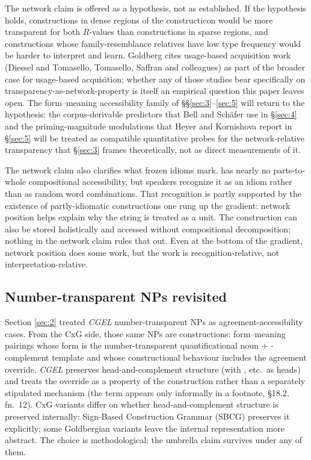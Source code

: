 The network claim is offered as a hypothesis, not as established. If the hypothesis holds, constructions in dense regions of the constructicon would be more transparent for both $R$-values than constructions in sparse regions, and constructions whose family-resemblance relatives have low type frequency would be harder to interpret and learn. Goldberg \autocite*[15]{goldberg-2006-constructions-at-work} cites usage-based acquisition work (Diessel and Tomasello, Tomasello, Saffran and colleagues) as part of the broader case for usage-based acquisition; whether any of those studies bear specifically on transparency-as-network-property is itself an empirical question this paper leaves open. The form--meaning accessibility family of §§\ref{sec:3}--\ref{sec:5} will return to the hypothesis: the corpus-derivable predictors that Bell and Schäfer use in §\ref{sec:4} and the priming-magnitude modulations that Heyer and Kornishova report in §\ref{sec:5} will be treated as compatible quantitative probes for the network-relative transparency that §\ref{sec:3} frames theoretically, not as direct measurements of it.

The network claim also clarifies what frozen idioms mark.  has nearly no parts-to-whole compositional accessibility, but speakers recognize it as an idiom rather than as random word combinations. That recognition is partly supported by the existence of partly-idiomatic constructions one rung up the gradient: network position helps explain why the string is treated as a unit. The construction can also be stored holistically and accessed without compositional decomposition; nothing in the network claim rules that out. Even at the bottom of the gradient, network position does some work, but the work is recognition-relative, not interpretation-relative.

\subsection{Number-transparent NPs revisited}\label{sec:3-4}

Section \ref{sec:2} treated \textit{CGEL} number-transparent NPs as agreement-accessibility cases. From the CxG side, those same NPs are constructions: form--meaning pairings whose form is the number-transparent quantificational noun + -complement template and whose constructional behaviour includes the agreement override. \textit{CGEL} preserves head-and-complement structure (with , etc.~as heads) and treats the override as a property of the construction rather than a separately stipulated mechanism (the term  appears only informally in a footnote, §18.2, fn.~12). CxG variants differ on whether head-and-complement structure is preserved internally: Sign-Based Construction Grammar (SBCG) preserves it explicitly; some Goldbergian variants leave the internal representation more abstract. The choice is methodological; the umbrella claim survives under any of them.

